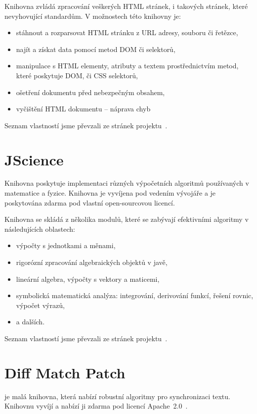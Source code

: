 Knihovna zvládá zpracování veškerých HTML stránek, i takových stránek, které nevyhovující standardům.
V možnostech této knihovny je:
\begin{itemize}
	\item stáhnout a rozparsovat HTML stránku z URL adresy, souboru či řetězce,
	\item najít a získat data pomocí metod DOM či  selektorů,
	\item manipulace s HTML elementy, atributy a textem prostřednictvím metod, které poskytuje DOM, či CSS selektorů,
	\item ošetření dokumentu před nebezpečným obsahem,
	\item vyčištění HTML dokumentu -- náprava chyb
\end{itemize}
Seznam vlastností jsme převzali ze stránek projektu~\cite{jsoup}.

\section{JScience}
Knihovna  poskytuje implementaci různých výpočetních algoritmů používaných v matematice a fyzice.
Knihovna je vyvíjena pod vedením vývojáře  a je poskytována zdarma pod vlastní open-sourcovou licencí.

Knihovna se skládá z několika modulů, které se zabývají efektivními algoritmy v následujících oblastech:
\begin{itemize}
	\item výpočty s jednotkami a měnami,
	\item rigorózní zpracování algebraických objektů v javě,
	\item lineární algebra, výpočty s vektory a maticemi,
	\item symbolická matematická analýza: integrování, derivování funkcí, řešení rovnic, výpočet výrazů,
	\item a dalších.
\end{itemize}
Seznam vlastností jsme převzali ze stránek projektu~\cite{jscience}.

\section{Diff Match Patch}
 je malá knihovna, která nabízí robustní algoritmy pro synchronizaci textu.
Knihovnu vyvíjí  a nabízí ji zdarma pod licencí Apache~2.0~\cite{apache20}.

